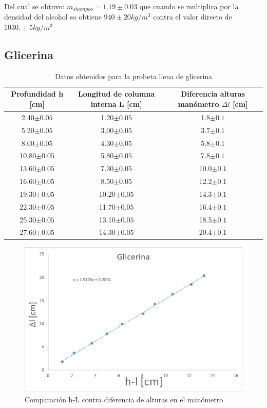 \documentclass[a4paper]{article}
\begin{document}
Del cual se obtuvo: $m_{shampoo}=1.19\pm0.03$ que cuando se multiplica por la densidad del alcohol so obtiene $940\pm20 kg/m^3$ contra el valor directo de $1030.\pm5 kg/m^3$


\subsection*{Glicerina}

\begin{table}[H]
  \centering
    \begin{tabular}{|c|c|c|} \hline
    Profundidad \textbf{h} [cm] & Longitud de columna interna \textbf{L} [cm] & Diferencia alturas manómetro \textbf{$\Delta l$} [cm] \\ \hline
    2.40$\pm0.05$  & 1.20$\pm0.05$  & 1.8$\pm0.1$ \\ \hline
    5.20$\pm0.05$  & 3.00$\pm0.05$  & 3.7$\pm0.1$ \\ \hline
    8.00$\pm0.05$  & 4.30$\pm0.05$  & 5.8$\pm0.1$ \\ \hline
    10.80$\pm0.05$ & 5.80$\pm0.05$  & 7.8$\pm0.1$ \\ \hline
    13.60$\pm0.05$ & 7.30$\pm0.05$  & 10.0$\pm0.1$ \\ \hline
    16.60$\pm0.05$ & 8.50$\pm0.05$  & 12.2$\pm0.1$ \\ \hline
    19.30$\pm0.05$ & 10.20$\pm0.05$ & 14.3$\pm0.1$ \\ \hline
    22.30$\pm0.05$ & 11.70$\pm0.05$ & 16.4$\pm0.1$ \\ \hline
    25.30$\pm0.05$ & 13.10$\pm0.05$ & 18.5$\pm0.1$ \\ \hline
    27.60$\pm0.05$ & 14.30$\pm0.05$ & 20.4$\pm0.1$ \\ \hline
    \end{tabular}%
    \caption{Datos obtenidos para la probeta llena de glicerina}
\end{table}%

\begin{figure}[H]
    \centering
    \includegraphics[width=12cm]{GRAF-Gli.jpg}
    \caption{Comparación h-L contra diferencia de alturas en el manómetro}
\end{figure}
\end{document}
